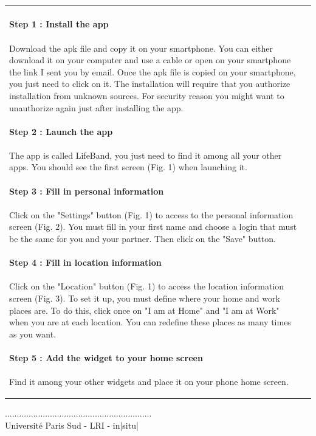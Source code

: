 \documentclass[11pt]{article}
\begin{document}
\begin{tabular}{p{3.5cm}p{12cm}}
\paragraph{Step 1 : Install the app}
\paragraph{} Download the apk file and copy it on your smartphone. You can either download it on your computer and use a cable or open on your smartphone the link I sent you by email. Once the apk file is copied on your smartphone, you just need to click on it. The installation will require that you authorize installation from unknown sources. For security reason you might want to unauthorize again just after installing the app.

\paragraph{Step 2 : Launch the app}
\paragraph{} The app is called LifeBand, you just need to find it among all your other apps. You should see the first screen (Fig. 1) when launching it.

\paragraph{Step 3 : Fill in personal information}
\paragraph{} Click on the "Settings" button (Fig. 1) to access to the personal information screen (Fig. 2). You must fill in your first name and choose a login that must be the same for you and your partner. Then click on the "Save" button.

\paragraph{Step 4 : Fill in location information}
\paragraph{} Click on the "Location" button (Fig. 1) to access the location information screen (Fig. 3). To set it up, you must define where your home and work places are. To do this, click once on "I am at Home" and "I am at Work" when you are at each location. You can redefine these places as many times as you want.

\paragraph{Step 5 : Add the widget to your home screen}
\paragraph{} Find it among your other widgets and place it on your phone home screen. \\
\end{tabular}


\vfill
\begin{center}
.............................................................. \\
Université Paris Sud - LRI - in|situ|
\end{center}
\end{document}
